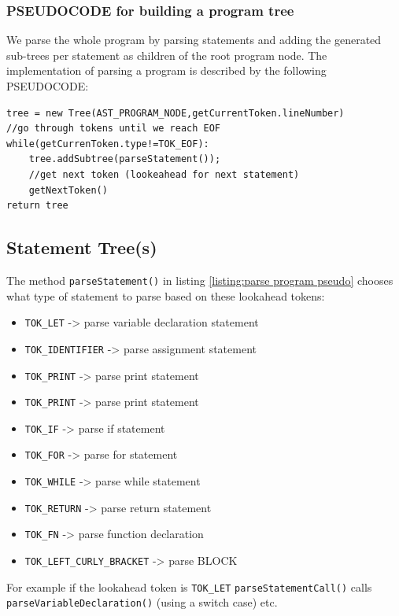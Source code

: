 \subsubsection{PSEUDOCODE for building a program tree}
We parse the whole program by parsing statements and adding the generated sub-trees per statement as children of the root program node. The implementation of parsing a program is described by the following PSEUDOCODE: 
\begin{lstlisting}[caption=PSEUDOCODE for building a program tree,label=listing:parse program pseudo]
tree = new Tree(AST_PROGRAM_NODE,getCurrentToken.lineNumber)
//go through tokens until we reach EOF
while(getCurrenToken.type!=TOK_EOF):
    tree.addSubtree(parseStatement());
    //get next token (lookeahead for next statement)
    getNextToken()
return tree
\end{lstlisting}
\subsection{Statement Tree(s)}
\label{sec:statement trees ast}
The method \verb!parseStatement()! in listing \ref{listing:parse program pseudo} chooses what type of statement to parse based on these lookahead tokens:
\begin{itemize}
    \item \verb!TOK_LET! -> parse variable declaration statement
    \item \verb!TOK_IDENTIFIER! -> parse assignment statement
    \item \verb!TOK_PRINT! -> parse print statement
    \item \verb!TOK_PRINT! -> parse print statement
    \item \verb!TOK_IF! -> parse if statement
    \item \verb!TOK_FOR! -> parse for statement
    \item \verb!TOK_WHILE! -> parse while statement
        \item \verb!TOK_RETURN! -> parse return statement
    \item \verb!TOK_FN! -> parse function declaration
    \item \verb!TOK_LEFT_CURLY_BRACKET! -> parse BLOCK
\end{itemize}

For example if the lookahead token is \verb!TOK_LET! \verb!parseStatementCall()! calls \verb!parseVariableDeclaration()! (using a switch case) etc.
